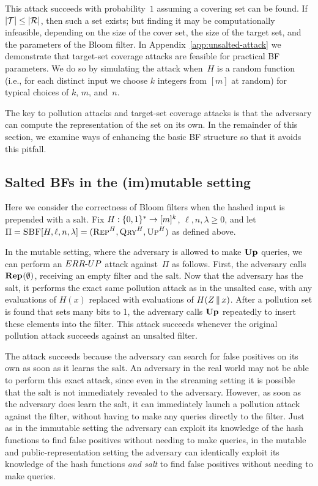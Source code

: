 This  attack succeeds with probability~$1$ assuming a covering set can
be found.  If $|\mathcal{T}| \leq |\mathcal{R}|$, then such a set exists; but finding it may be
computationally infeasible, depending on the size of the cover set, the size of
the target set, and the parameters of the Bloom filter.
%
In Appendix~\ref{app:unsalted-attack} we demonstrate that target-set coverage
attacks are feasible for practical BF parameters. We do so by simulating the
attack when~$H$ is a random function (i.e., for each distinct input we choose
$k$ integers from $[m]$ at random) for typical choices of $k$, $m$, and~$n$.
%


The key to pollution attacks and target-set coverage attacks is that the
adversary can compute the representation of the set on its own. In the remainder
of this section, we examine ways of enhancing the basic BF structure so that it
avoids this pitfall.

\subsection{Salted BFs in the (im)mutable setting}
%
Here we consider the correctness of Bloom filters when the hashed input is
prepended with a salt.
%
Fix $H:\{0,1\}^*\to[m]^k$, $\ell,n,\lambda\geq0$, and let
$\Pi = \textnormal{\textsc{SBF}}[H,\ell,n,\lambda] = (\textnormal{\textsc{Rep}}^H, \textnormal{\textsc{Qry}}^H, \textnormal{\textsc{Up}}^H)$ as defined above.

In the mutable setting, where the adversary is allowed to make $\textup{\textbf{Up}}\hspace{0.5pt}$ queries,
we can perform an ${ERR\mbox{-}UP}$ attack against~$\Pi$ as follows. First, the adversary
calls $\textup{\textbf{Rep}}\hspace{0.5pt}(\emptyset)$, receiving an empty filter and the salt. Now that the
adversary has the salt, it performs the exact same pollution attack as in the
unsalted case, with any evaluations of $H(x)$ replaced with evaluations of
$H(Z \, \| \, x)$. After a pollution set is found that sets many bits to 1, the
adversary calls $\textup{\textbf{Up}}\hspace{0.5pt}$ repeatedly to insert these elements into the filter. This
attack succeeds whenever the original pollution attack succeeds against an
unsalted filter.

%

The attack succeeds because the adversary can search for false positives on its
own as soon as it learns the salt. An adversary in the real world may not be
able to perform this exact attack, since even in the streaming setting it is
possible that the salt is not immediately revealed to the adversary. However, as
soon as the adversary does learn the salt, it can immediately launch a pollution
attack against the filter, without having to make any queries directly to the
filter. Just as in the immutable setting the adversary can exploit its knowledge
of the hash functions to find false positives without needing to make queries,
in the mutable and public-representation setting the adversary can identically
exploit its knowledge of the hash functions \textit{and salt} to find false
positives without needing to make queries.

